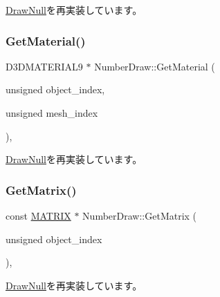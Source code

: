 \mbox{\hyperlink{class_draw_null_a8496ed1b1f765a331a8f1704122b8ca4}{Draw\+Null}}を再実装しています。

\mbox{\label{class_number_draw_a3348d9d1cdd9dd03be25b82069275ca5}} 
\subsubsection{\texorpdfstring{Get\+Material()}{GetMaterial()}}
{\footnotesize\ttfamily D3\+D\+M\+A\+T\+E\+R\+I\+A\+L9 $\ast$ Number\+Draw\+::\+Get\+Material (\begin{DoxyParamCaption}\item[{unsigned}]{object\+\_\+index,  }\item[{unsigned}]{mesh\+\_\+index }\end{DoxyParamCaption})\hspace{0.3cm}{\ttfamily [override]}, {\ttfamily [virtual]}}



\mbox{\hyperlink{class_draw_null_a84969d22d3436986f214e9896fe44fc6}{Draw\+Null}}を再実装しています。

\mbox{\label{class_number_draw_a78f50afa05e728811d89a491f5eec899}} 
\subsubsection{\texorpdfstring{Get\+Matrix()}{GetMatrix()}}
{\footnotesize\ttfamily const \mbox{\hyperlink{_vector3_d_8h_a032295cd9fb1b711757c90667278e744}{M\+A\+T\+R\+IX}} $\ast$ Number\+Draw\+::\+Get\+Matrix (\begin{DoxyParamCaption}\item[{unsigned}]{object\+\_\+index }\end{DoxyParamCaption})\hspace{0.3cm}{\ttfamily [override]}, {\ttfamily [virtual]}}



\mbox{\hyperlink{class_draw_null_adede079e9c11a756090740b20bb43022}{Draw\+Null}}を再実装しています。

\mbox{\label{class_number_draw_a8234fb06d885feaa8a2f0ecf256db9a0}} 
